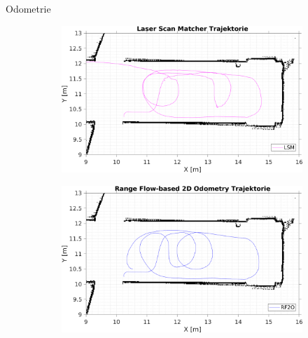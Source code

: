 \documentclass{beamer}
\begin{document}
\begin{frame}{Odometrie}
\begin{figure}
\begin{subfigure}{0.47\linewidth}
			\centering
			\includegraphics[width=\linewidth]{Record_2018-02-08-12-33-53_trajectory3}
		\end{subfigure}
		\hfill
		\begin{subfigure}{0.47\linewidth}
			\centering
			\includegraphics[width=\linewidth]{Record_2018-02-08-12-33-53_trajectory4}
		\end{subfigure}
	\end{figure}

\end{frame}
\end{document}
